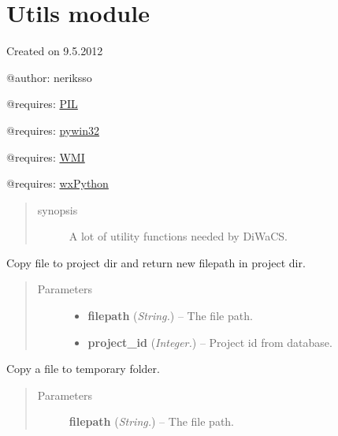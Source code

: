 \documentclass[letterpaper,10pt,english]{sphinxmanual}
\begin{document}
\section{Utils module}
\label{api:utils-module}\label{api:module-utils}
Created on 9.5.2012

@author: neriksso

@requires: \href{http://www.pythonware.com/products/pil/}{PIL}

@requires: \href{https://sourceforge.net/projects/pywin32/}{pywin32}

@requires: \href{https://pypi.python.org/pypi/WMI/}{WMI}

@requires: \href{http://www.wxpython.org/}{wxPython}
\begin{quote}\begin{description}
\item[{synopsis}] \leavevmode
A lot of utility functions needed by DiWaCS.

\end{description}\end{quote}

\begin{fulllineitems}
\label{api:utils.CopyFileToProject}
Copy file to project dir and return new filepath in project dir.
\begin{quote}\begin{description}
\item[{Parameters}] \leavevmode\begin{itemize}
\item {} 
\textbf{filepath} (\emph{String.}) -- The file path.

\item {} 
\textbf{project\_id} (\emph{Integer.}) -- Project id from database.

\end{itemize}

\end{description}\end{quote}

\end{fulllineitems}


\begin{fulllineitems}
\label{api:utils.CopyToTemp}
Copy a file to temporary folder.
\begin{quote}\begin{description}
\item[{Parameters}] \leavevmode
\textbf{filepath} (\emph{String.}) -- The file path.

\end{description}\end{quote}

\end{fulllineitems}
\end{document}
